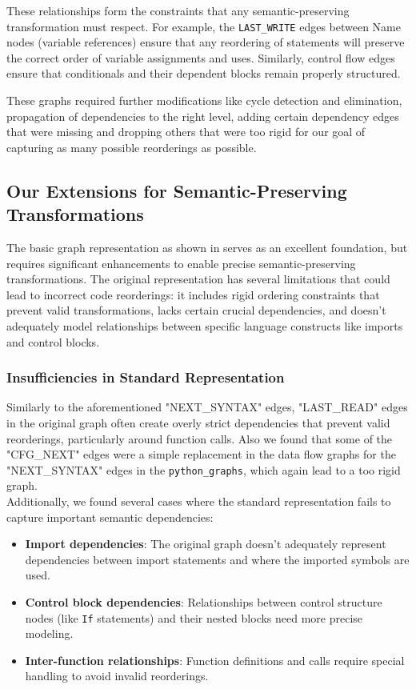 \documentclass[%
thesis=student,%
coverpage=false,%
titlepage=false,%
headmarks=true, %
english,%
font=libertine, %
math=newpxtx, %
BCOR=5mm,%
coverBCOR=11mm%
]{tum-templates/book/tumbook}
\begin{document}
These relationships form the constraints that any semantic-preserving transformation must respect. For example, the \texttt{LAST\_WRITE} edges between Name nodes (variable references) ensure that any reordering of statements will preserve the correct order of variable assignments and uses. Similarly, control flow edges ensure that conditionals and their dependent blocks remain properly structured.

These graphs required further modifications like cycle detection and elimination, propagation of dependencies to the right level, adding certain dependency edges that were missing and dropping others that were too rigid for our goal of capturing as many possible reorderings as possible. 

\subsection{Our Extensions for Semantic-Preserving Transformations}

The basic graph representation as shown in  serves as an excellent foundation, but requires significant enhancements to enable precise semantic-preserving transformations. The original representation has several limitations that could lead to incorrect code reorderings: it includes rigid ordering constraints that prevent valid transformations, lacks certain crucial dependencies, and doesn't adequately model relationships between specific language constructs like imports and control blocks.

\subsubsection{Insufficiencies in Standard Representation}

Similarly to the aforementioned "NEXT\_SYNTAX" edges, "LAST\_READ" edges in the original graph often create overly strict dependencies that prevent valid reorderings, particularly around function calls. Also we found that some of the "CFG\_NEXT" edges were a simple replacement in the data flow graphs for the "NEXT\_SYNTAX" edges in the \texttt{python\_graphs}, which again lead to a too rigid graph. \\

Additionally, we found several cases where the standard representation fails to capture important semantic dependencies:

\begin{itemize}
    \item \textbf{Import dependencies}: The original graph doesn't adequately represent dependencies between import statements and where the imported symbols are used.
    \item \textbf{Control block dependencies}: Relationships between control structure nodes (like \texttt{If} statements) and their nested blocks need more precise modeling.
    \item \textbf{Inter-function relationships}: Function definitions and calls require special handling to avoid invalid reorderings.
\end{itemize}
\end{document}
